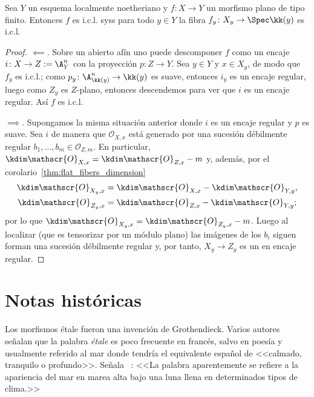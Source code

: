 \begin{cor}\label{lci_local_on_fibers}
	Sea $Y$ un esquema localmente noetheriano y $f \colon X \to Y$ un morfismo plano de tipo finito.
	Entonces $f$ es i.c.l. syss para todo $y \in Y$ la fibra $f_y \colon X_y \to \Spec\kk(y)$ es i.c.l.
\end{cor}
\begin{proof}
	$\impliedby$.
	Sobre un abierto afín uno puede descomponer $f$ como un encaje $i \colon X \to Z := \A_Y^n$ con la proyección $p\colon Z \to Y$.
	Sea $y \in Y$ y $x \in X_y$, de modo que $f_y$ es i.c.l.; como $p_y \colon \A_{\kk(y)}^n \to \kk(y)$ es suave, entonces $i_y$ es un encaje regular,
	luego como $Z_y$ es $Z$-plano, entonces descendemos para ver que $i$ es un encaje regular.
	Así $f$ es i.c.l.

	$\implies$. Supongamos la misma situación anterior donde $i$ es un encaje regular y $p$ es suave.
	Sea $i$ de manera que $\mathscr{O}_{X, x}$ está generado por una sucesión débilmente regular $b_1, \dots, b_m \in \mathscr{O}_{Z, m}$.
	En particular, $\kdim\mathscr{O}_{X, x} = \kdim\mathscr{O}_{Z, x} - m$ y, además, por el corolario~\ref{thm:flat_fibers_dimension}
	\begin{align*}
		\kdim\mathscr{O}_{X_y, x} &= \kdim\mathscr{O}_{X, x} - \kdim\mathscr{O}_{Y, y}, \\
		\kdim\mathscr{O}_{Z_y, x} &= \kdim\mathscr{O}_{Z, x} - \kdim\mathscr{O}_{Y, y};
	\end{align*}
	por lo que $\kdim\mathscr{O}_{X_y, x} = \kdim\mathscr{O}_{Z_y, x} - m$.
	Luego al localizar (que es tensorizar por un módulo plano) las imágenes de los $b_i$ siguen forman una sucesión débilmente regular y,
	por tanto, $X_y \to Z_y$ es un en encaje regular.
\end{proof}

\section*{Notas históricas}
Los morfismos étale fueron una invención de Grothendieck.
Varios autores señalan que la palabra \textit{étale} es poco frecuente en francés, salvo en poesía y usualmente referido al mar donde tendría el
equivalente español de <<calmado, tranquilo o profundo>>.
Señala \citeauthor{mumford:red}~\cite{mumford:red}:
<<La palabra aparentemente se refiere a la apariencia del mar en marea alta bajo una luna llena en determinados tipos de clima.>>

